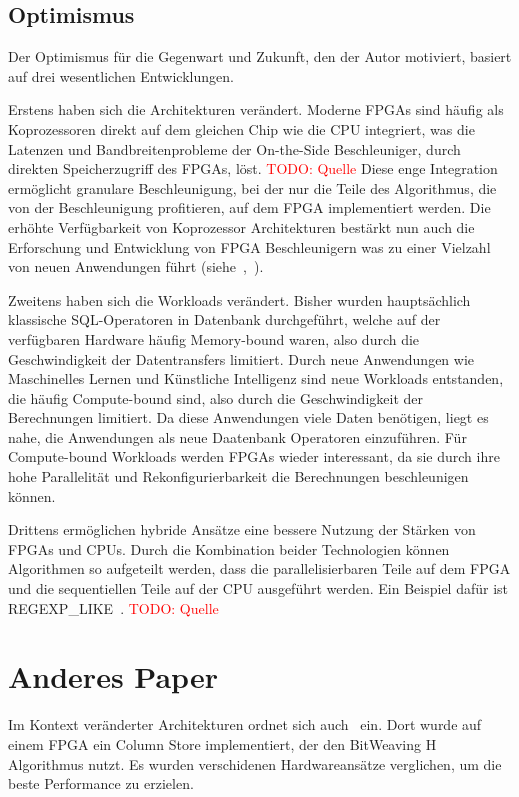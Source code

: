 \documentclass[conference]{IEEEtran}
\newcommand{\todo}[1]{\textcolor{red}{TODO: #1}}
\begin{document}
\subsection{Optimismus}
Der Optimismus für die Gegenwart und Zukunft, den der Autor motiviert, basiert auf drei wesentlichen Entwicklungen.

Erstens haben sich die Architekturen verändert. Moderne FPGAs sind häufig als Koprozessoren direkt auf dem gleichen Chip wie die CPU integriert,
was die Latenzen und Bandbreitenprobleme der On-the-Side Beschleuniger, durch direkten Speicherzugriff des FPGAs, löst. \todo{Quelle}
Diese enge Integration ermöglicht granulare Beschleunigung, bei der nur die Teile des Algorithmus, die von der Beschleunigung profitieren,
auf dem FPGA implementiert werden. Die erhöhte Verfügbarkeit von Koprozessor Architekturen bestärkt nun auch die Erforschung und Entwicklung
von FPGA Beschleunigern was zu einer Vielzahl von neuen Anwendungen führt (siehe~\cite{lisa_column_2018},~\cite{sidler_accelerating_2017}).


Zweitens haben sich die Workloads verändert. Bisher wurden hauptsächlich klassische SQL-Operatoren in Datenbank durchgeführt, welche auf der verfügbaren Hardware
häufig Memory-bound waren, also durch die Geschwindigkeit der Datentransfers limitiert. Durch neue Anwendungen wie Maschinelles Lernen und Künstliche Intelligenz
sind neue Workloads entstanden, die häufig Compute-bound sind, also durch die Geschwindigkeit der Berechnungen limitiert. Da diese Anwendungen viele Daten benötigen,
liegt es nahe, die Anwendungen als neue Daatenbank Operatoren einzuführen. Für Compute-bound Workloads werden FPGAs wieder interessant, da sie durch ihre
hohe Parallelität und Rekonfigurierbarkeit die Berechnungen beschleunigen können.

Drittens ermöglichen hybride Ansätze eine bessere Nutzung der Stärken von FPGAs und CPUs. Durch die Kombination beider Technologien
können Algorithmen so aufgeteilt werden, dass die parallelisierbaren Teile auf dem FPGA und die sequentiellen Teile auf der CPU ausgeführt werden. Ein Beispiel dafür ist
REGEXP\_LIKE~\cite{sidler_accelerating_2017}.
\todo{Quelle}


\section{Anderes Paper} %
Im Kontext veränderter Architekturen ordnet sich auch~\cite{lisa_column_2018} ein. Dort wurde auf einem FPGA ein Column Store implementiert, der
den BitWeaving H Algorithmus nutzt. Es wurden verschidenen Hardwareansätze verglichen, um die beste Performance zu erzielen.
\end{document}
